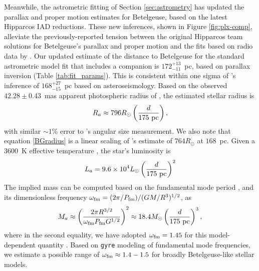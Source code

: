 \documentclass[twocolumn]{aastex631}
\begin{document}
Meanwhile, the astrometric fitting of Section \ref{sec:astrometry} has updated the parallax and proper motion estimates for Betelgeuse, based on the latest Hipparcos IAD reductions. These new  inferences, shown in Figure  \ref{fig:plx-comp}, alleviate the previously-reported tension between the original Hipparcos team solutions for Betelgeuse's parallax and proper motion and the fits based on radio data by \citet{2017AJ....154...11H}.  Our updated  estimate of the distance to Betelgeuse for the standard astrometric model fit that includes a companion is $172^{+13}_{-11}$~pc, based on parallax inversion (Table \ref{tab:fit_params}). This is consistent within one sigma of \citet{2020ApJ...902...63J}'s inference of $168^{+27}_{-15}$~pc based on asteroseismology. Based on the observed $42.28\pm0.43$~mas apparent photospheric radius of \citet{2014A&A...572A..17M}, the estimated stellar radius is 
\begin{equation}\label{BGradius}
    R_a \approx 796 R_\odot \left( d \over 175~{\rm pc} \right),
\end{equation}
with similar $\sim 1$\% error to \citet{2014A&A...572A..17M}'s angular size measurement. We also note that equation \eqref{BGradius} is a linear scaling of \citet{2020ApJ...902...63J}'s estimate of $764 R_\odot$ at $168$~pc. Given a $3600$~K effective temperature \citep{2020ApJ...891L..37L}, the star's luminosity is 
\begin{equation}\label{BGluminosity}
    L_a = 9.6 \times 10^4 L_\odot \left( d \over 175~{\rm pc} \right)^2
\end{equation}
The implied mass can be computed based on the fundamental mode period \citep{2020ApJ...902...63J}, and its dimensionless frequency $\omega_{\rm fm} = (2\pi / P_{\rm fm}) / (GM / R^3)^{1/2}$, as 
\begin{equation}\label{BGmass}
    M_a \approx \left(\frac{2 \pi R^{3/2}}{\omega_{\rm fm} P_{\rm fm} G^{1/2}   } \right)^2  \approx 18.4 M_\odot  \left( d \over 175~{\rm pc} \right)^3 ,
\end{equation}
where in the second equality, we have adopted $\omega_{\rm fm} = 1.45$ for this model-dependent quantity \citep{2023ApJ...956...27M}. Based on {\tt gyre} modeling of fundamental mode frequencies, we estimate a possible range of $\omega_{\rm fm} \approx  1.4 - 1.5$ for broadly Betelgeuse-like stellar models. 
\end{document}
